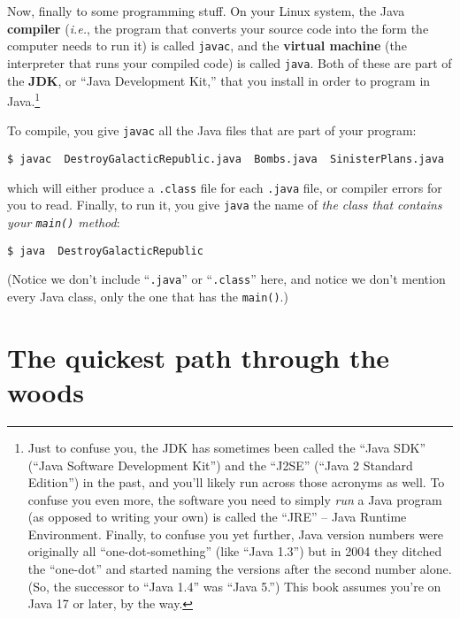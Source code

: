 \begin{enumerate}
Now, finally to some programming stuff. On your Linux system, the Java
\textbf{compiler} (\textit{i.e.}, the program that converts your source code
into the form the computer needs to run it) is called \texttt{javac}, and the
\textbf{virtual machine} (the interpreter that runs your compiled code) is
called \texttt{java}. Both of these are part of the \textbf{JDK}, or ``Java
Development Kit,'' that you install in order to program in Java.\footnote{Just
to confuse you, the JDK has sometimes been called the ``Java SDK'' (``Java
Software Development Kit'') and the ``J2SE'' (``Java 2 Standard Edition'') in
the past, and you'll likely run across those acronyms as well. To confuse you
even more, the software you need to simply \textit{run} a Java program (as
opposed to writing your own) is called the ``JRE'' -- Java Runtime
Environment. Finally, to confuse you yet further, Java version numbers were
originally all ``one-dot-something'' (like ``Java 1.3'') but in 2004 they
ditched the ``one-dot'' and started naming the versions after the second
number alone. (So, the successor to ``Java 1.4'' was ``Java 5.'') This book
assumes you're on Java 17 or later, by the way.}


To compile, you give \texttt{javac} all the Java files that are part of your
program:

\begin{Verbatim}[fontsize=\scriptsize]
$ javac  DestroyGalacticRepublic.java  Bombs.java  SinisterPlans.java
\end{Verbatim}

which will either produce a \texttt{.class} file for each \texttt{.java} file,
or compiler errors for you to read. Finally, to run it, you give \texttt{java}
the name of \textit{the class that contains your \texttt{main()} method}:

\begin{Verbatim}[fontsize=\footnotesize]
$ java  DestroyGalacticRepublic
\end{Verbatim}

(Notice we don't include ``\texttt{.java}'' or ``\texttt{.class}'' here, and
notice we don't mention every Java class, only the one that has the
\texttt{main()}.)

\end{enumerate}

\pagebreak
\section{The quickest path through the woods}

